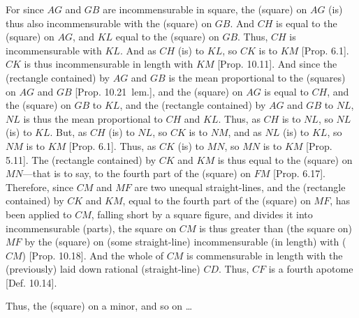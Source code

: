 \begin{Parallel}{}{}
{For since $AG$ and $GB$ are incommensurable in square, the (square)
on $AG$ (is) thus also incommensurable with the (square) on $GB$.
And $CH$ is equal to the (square) on $AG$, and $KL$ equal to the (square) on $GB$. Thus, $CH$ is incommensurable with $KL$. And as $CH$ (is) to
$KL$, so $CK$ is to $KM$ [Prop. 6.1]. 
$CK$ is thus incommensurable in length with $KM$ [Prop. 10.11]. And since the (rectangle contained)
by $AG$ and $GB$ is the mean proportional to the (squares) on $AG$
and $GB$ [Prop. 10.21~lem.], and the
(square) on $AG$ is equal to $CH$, and the (square) on $GB$ to $KL$,
and the (rectangle contained) by $AG$ and $GB$ to $NL$, $NL$
is thus the mean proportional to $CH$ and $KL$. Thus, as $CH$
is to $NL$, so $NL$ (is) to $KL$. But, as $CH$ (is) to $NL$, so
$CK$ is to $NM$, and as $NL$ (is) to $KL$, so $NM$ is to $KM$ [Prop. 6.1]. Thus, as $CK$ (is) to $MN$, so
$MN$ is to $KM$ [Prop. 5.11]. The (rectangle
contained) by $CK$ and $KM$ is thus equal to the (square) on $MN$---that is to say, to the fourth part of the (square) on $FM$ [Prop. 6.17]. Therefore, since $CM$ and $MF$ are two unequal straight-lines, and the (rectangle contained) by $CK$ and
$KM$, equal to the fourth part of the (square) on $MF$, has been applied
to $CM$, falling short by a square figure, and divides it into incommensurable (parts), the square on $CM$ is thus greater than (the
square on) $MF$ by the (square) on (some straight-line) incommensurable
(in length) with ($CM$) [Prop. 10.18]. 
And the whole of $CM$ is commensurable in length with the (previously)
laid down rational (straight-line) $CD$. Thus, $CF$ is a fourth apotome
[Def. 10.14].

Thus, the (square) on a minor, and so on \ldots}
\end{Parallel}

